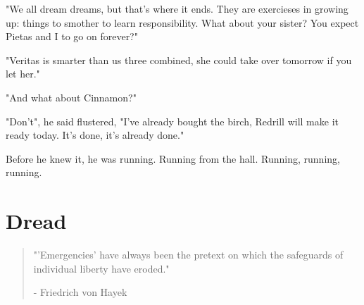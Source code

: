 \documentclass[smalldemyvopaper,11pt,twoside,onecolumn,openright,extrafontsizes]{memoir}
\begin{document}
"We all dream dreams, but that's where it ends. They are exercieses in growing up: things to smother to learn responsibility. What about your sister? You expect Pietas and I to go on forever?"

"Veritas is smarter than us three combined, she could take over tomorrow if you let her."

"And what about Cinnamon?"

"Don't", he said flustered, "I've already bought the birch, Redrill will make it ready today. It's done, it's already done."

Before he knew it, he was running. Running from the hall. Running, running, running.




\chapter{Dread}

\vspace{-1.3cm}
\begin{localsize}{10}
	\begin{quote}
		"'Emergencies' have always been the pretext on which the safeguards of individual liberty have eroded."
		\begin{flushright}- Friedrich von Hayek\end{flushright}
	\end{quote} 
\end{localsize}
\vspace{1cm}
\end{document}
